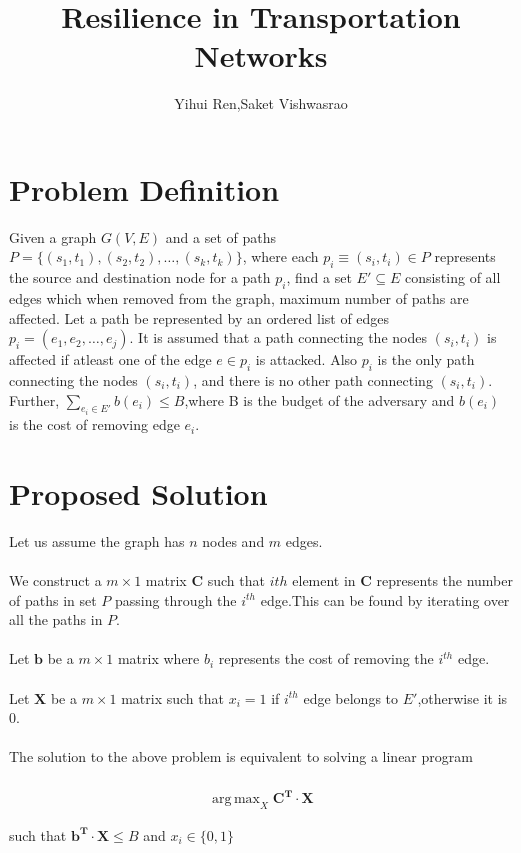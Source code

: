 \documentclass[10pt]{article}
\DeclareMathOperator*{\argmax}{arg\,max}
\begin{document}
\title{Resilience in Transportation Networks}
\author{Yihui Ren,Saket Vishwasrao}
\maketitle

\section*{Problem Definition}
Given a graph $G(V,E)$ and a set of paths $P=\{(s_1,t_1),(s_2,t_2),
\dots,(s_k,t_k)\}$, where each $p_i \equiv (s_i,t_i) \in P$ represents the source and destination node for a path $p_i$,  
find a set $E' \subseteq E$ consisting of all edges which when removed from the graph, maximum number of paths are affected. 
Let a path be represented by an ordered list of edges $p_i=(e_1,e_2,\dots,e_j) $. 
It is assumed that a path connecting the nodes $(s_i,t_i)$ is affected if atleast one of the edge $e\in p_i$ is attacked. 
Also $p_i$ is the only path connecting the nodes $(s_i,t_i)$, and there is no other path connecting $(s_i,t_i)$.
Further, $\sum_{e_i \in E'} b(e_i) \leq B$,where B is the budget of the adversary and $b(e_i)$ is the cost of removing edge $e_i$.

\section*{Proposed Solution}

Let us assume the graph has $n$ nodes and $m$ edges.\\\\
We construct a $m \times 1$ matrix $\mathbf{C}$ such that $ith$ element in $\mathbf{C}$ represents the number of paths in set  $P$ passing through the $i^{th}$ edge.This can be found by iterating over all the paths in $P$.\\\\
Let $\mathbf{b}$ be a $m \times 1$ matrix where $b_i$ represents the cost of removing the $i^{th}$ edge.\\\\
Let $\mathbf{X}$ be a $m \times 1$ matrix such that $x_i=1$  if $i^{th}$ edge belongs to $E'$,otherwise it is 0.\\\\
The solution to the above problem is equivalent to solving a linear program\\\\
\begin{align}
	\argmax_X \mathbf{C^T\cdot X}
\end{align}
\begin{center}such that $\mathbf{b^T\cdot X} \leq B$ and $x_i \in \{0,1\}$\end{center}
\end{document}
